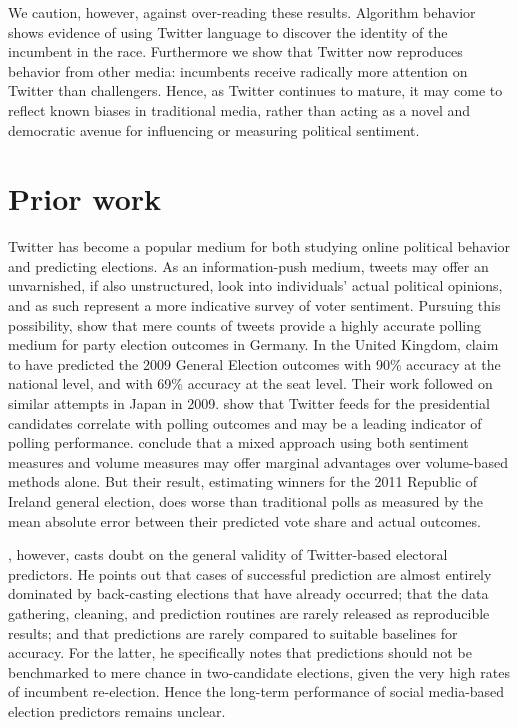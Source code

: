 \documentclass[11pt]{article}
\begin{document}
We caution, however, against over-reading these results. Algorithm
behavior shows evidence of using Twitter language to discover the
identity of the incumbent in the race. Furthermore we show that
Twitter now reproduces behavior from other media: incumbents receive
radically more attention on Twitter than challengers. Hence, as
Twitter continues to mature, it may come to reflect known biases in
traditional media, rather than acting as a novel and democratic avenue
for influencing or measuring political sentiment.

\section{Prior work}
\label{sec:prior-work}

Twitter has become a popular medium for both studying online political
behavior and predicting elections. As an information-push medium,
tweets may offer an unvarnished, if also unstructured, look into
individuals' actual political opinions, and as such represent a more
indicative survey of voter sentiment. Pursuing this possibility,
\cite{tumasjan2010election} show that mere counts of tweets provide a
highly accurate polling medium for party election outcomes in
Germany. In the United Kingdom, \cite{tweetminster2010} claim to have
predicted the 2009 General Election outcomes with 90\% accuracy at the
national level, and with 69\% accuracy at the seat level. Their work
followed on similar attempts in Japan in 2009. \cite{o2010tweets} show
that Twitter feeds for the presidential candidates correlate with
polling outcomes and may be a leading indicator of polling
performance. \cite{bermingham2011using} conclude that a mixed approach
using both sentiment measures and volume measures may offer marginal
advantages over volume-based methods alone. But their result,
estimating winners for the 2011 Republic of Ireland general election,
does worse than traditional polls as measured by the mean absolute
error between their predicted vote share and actual outcomes.

\cite{gayo2012wanted}, however, casts doubt on the general validity of
Twitter-based electoral predictors. He points out that cases of
successful prediction are almost entirely dominated by back-casting
elections that have already occurred; that the data gathering,
cleaning, and prediction routines are rarely released as reproducible
results; and that predictions are rarely compared to suitable
baselines for accuracy. For the latter, he specifically notes that
predictions should not be benchmarked to mere chance in two-candidate
elections, given the very high rates of incumbent re-election. Hence
the long-term performance of social media-based election predictors
remains unclear.
\end{document}
